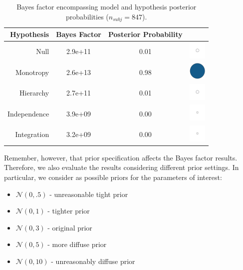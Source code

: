 \documentclass[
]{book}
\providecommand{\tightlist}{%
  \setlength{\itemsep}{0pt}\setlength{\parskip}{0pt}}
\begin{document}
\begin{table}[!h]

\caption{\label{tab:table-bf-results-ext}Bayes factor encompassing model and hypothesis posterior probabilities  ($n_{subj} = 847$).}
\centering
\begin{tabular}[t]{rcc>{\centering\arraybackslash}m{1cm}}
\toprule
\textbf{Hypothesis} & \textbf{Bayes Factor} & \textbf{Posterior Probability} & \textbf{ }\\
\midrule
Null & 2.9e+11 & 0.01 & \includegraphics[width=0.33in, height=0.33in]{images/ball_BF_ext_null.png}\\
Monotropy & 2.6e+13 & 0.98 & \includegraphics[width=0.33in, height=0.33in]{images/ball_BF_ext_monotropy.png}\\
Hierarchy & 2.7e+11 & 0.01 & \includegraphics[width=0.33in, height=0.33in]{images/ball_BF_ext_hierarchy.png}\\
Independence & 3.9e+09 & 0.00 & \includegraphics[width=0.33in, height=0.33in]{images/ball_BF_ext_independence.png}\\
Integration & 3.2e+09 & 0.00 & \includegraphics[width=0.33in, height=0.33in]{images/ball_BF_ext_integration.png}\\
\bottomrule
\end{tabular}
\end{table}

Remember, however, that prior specification affects the Bayes factor results. Therefore, we also evaluate the results considering different prior settings. In particular, we consider as possible priors for the parameters of interest:

\begin{itemize}
\tightlist
\item
  \(\mathcal{N}(0,.5)\) - unreasonable tight prior
\item
  \(\mathcal{N}(0,1)\) - tighter prior
\item
  \(\mathcal{N}(0,3)\) - original prior
\item
  \(\mathcal{N}(0,5)\) - more diffuse prior
\item
  \(\mathcal{N}(0,10)\) - unreasonably diffuse prior
\end{itemize}
\end{document}
